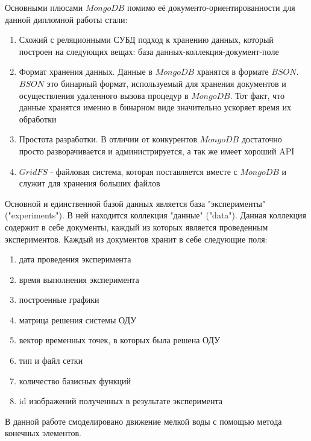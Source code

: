 \documentclass[14pt]{extreport}
\begin{document}
Основными плюсами $MongoDB$ помимо её документо-ориентированности для данной дипломной работы стали:

\begin{enumerate}

\item Схожий с реляционными СУБД подход к хранению данных, который построен на следующих вещах: база данных-коллекция-документ-поле

\item Формат хранения данных. Данные в $MongoDB$ хранятся в формате $BSON$. $BSON$ это бинарный формат, используемый для хранения документов и осуществления удаленного вызова процедур в $MongoDB$. Тот факт, что данные хранятся именно в бинарном виде значительно ускоряет время их обработки

\item Простота разработки. В отличии от конкурентов $MongoDB$ достаточно просто разворачивается и администрируется, а так же имеет хороший API 

\item $GridFS$ - файловая система, которая поставляется вместе с $MongoDB$ и служит для хранения больших файлов

\end{enumerate}

Основной и единственной базой данных является база "эксперименты" ("experiments"). В ней находится коллекция  "данные" ("data"). Данная коллекция содержит в себе документы, каждый из которых является проведенным экспериментов. Каждый из документов хранит в себе следующие поля:

\begin{enumerate}
\item дата проведения эксперимента
\item время выполнения эксперимента
\item построенные графики
\item матрица решения системы ОДУ
\item вектор временных точек, в которых была решена ОДУ
\item тип и файл сетки
\item количество базисных функций
\item id изображений полученных в результате эксперимента
\end{enumerate}










\conclusions
В данной работе смоделировано движение мелкой воды с помощью метода конечных элементов.
\end{document}
